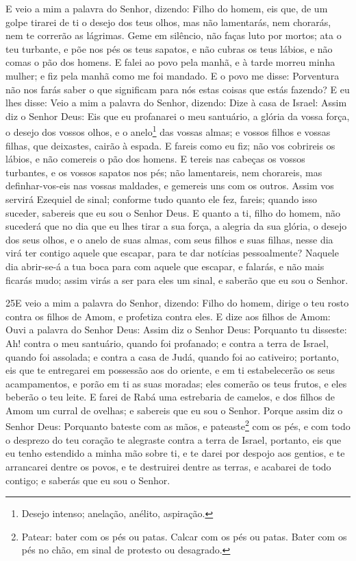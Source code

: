 E veio a mim a palavra do Senhor, dizendo: Filho do homem,
eis que, de um golpe tirarei de ti o desejo dos teus olhos, mas não
lamentarás, nem chorarás, nem te correrão as lágrimas. Geme
em silêncio, não faças luto por mortos; ata o teu turbante, e põe
nos pés os teus sapatos, e não cubras os teus lábios, e não comas o
pão dos homens. E falei ao povo pela manhã, e à tarde morreu
minha mulher; e fiz pela manhã como me foi mandado. E o povo
me disse: Porventura não nos farás saber o que significam para nós
estas coisas que estás fazendo? E eu lhes disse: Veio a mim a
palavra do Senhor, dizendo: Dize à casa de Israel: Assim diz
o Senhor Deus: Eis que eu profanarei o meu santuário, a glória da
vossa força, o desejo dos vossos olhos, e o anelo\footnote{Desejo
intenso; anelação, anélito, aspiração.} das vossas almas; e vossos
filhos e vossas filhas, que deixastes, cairão à espada. E
fareis como eu fiz; não vos cobrireis os lábios, e não comereis o
pão dos homens. E tereis nas cabeças os vossos turbantes, e
os vossos sapatos nos pés; não lamentareis, nem chorareis, mas
definhar-vos-eis nas vossas maldades, e gemereis uns com os outros.
Assim vos servirá Ezequiel de sinal; conforme tudo quanto ele
fez, fareis; quando isso suceder, sabereis que eu sou o Senhor Deus.
E quanto a ti, filho do homem, não sucederá que no dia que eu
lhes tirar a sua força, a alegria da sua glória, o desejo dos seus
olhos, e o anelo de suas almas, com seus filhos e suas filhas,
nesse dia virá ter contigo aquele que escapar, para te dar
notícias pessoalmente? Naquele dia abrir-se-á a tua boca para
com aquele que escapar, e falarás, e não mais ficarás mudo; assim
virás a ser para eles um sinal, e saberão que eu sou o Senhor.

\medskip

\lettrine{25} E veio a mim a palavra do Senhor, dizendo:
Filho do homem, dirige o teu rosto contra os filhos de Amom, e
profetiza contra eles. E dize aos filhos de Amom: Ouvi a palavra
do Senhor Deus: Assim diz o Senhor Deus: Porquanto tu disseste: Ah!
contra o meu santuário, quando foi profanado; e contra a terra de
Israel, quando foi assolada; e contra a casa de Judá, quando foi ao
cativeiro; portanto, eis que te entregarei em possessão aos do
oriente, e em ti estabelecerão os seus acampamentos, e porão em ti
as suas moradas; eles comerão os teus frutos, e eles beberão o teu
leite. E farei de Rabá uma estrebaria de camelos, e dos filhos
de Amom um curral de ovelhas; e sabereis que eu sou o Senhor.
Porque assim diz o Senhor Deus: Porquanto bateste com as mãos, e
pateaste\footnote{Patear: bater com os pés ou patas. Calcar com os
pés ou patas. Bater com os pés no chão, em sinal de protesto ou
desagrado.} com os pés, e com todo o desprezo do teu coração te
alegraste contra a terra de Israel, portanto, eis que eu tenho
estendido a minha mão sobre ti, e te darei por despojo aos gentios,
e te arrancarei dentre os povos, e te destruirei dentre as terras, e
acabarei de todo contigo; e saberás que eu sou o Senhor.

